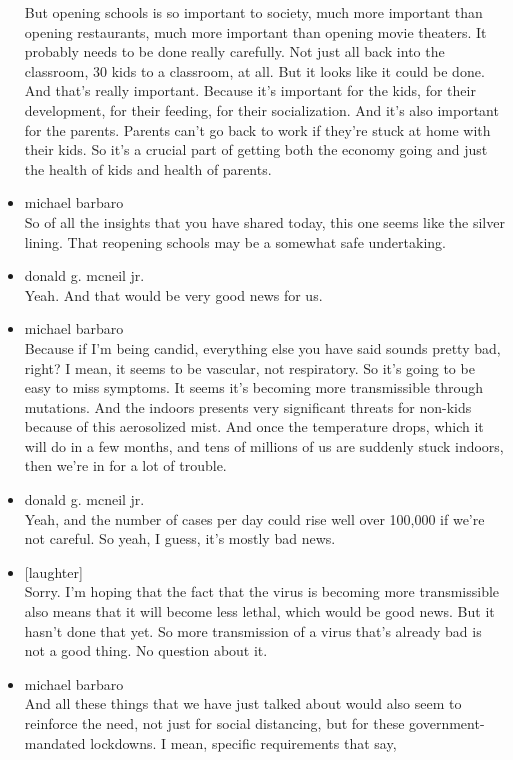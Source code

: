 \begin{itemize}
  But opening schools is so important to society, much more important
  than opening restaurants, much more important than opening movie
  theaters. It probably needs to be done really carefully. Not just all
  back into the classroom, 30 kids to a classroom, at all. But it looks
  like it could be done. And that's really important. Because it's
  important for the kids, for their development, for their feeding, for
  their socialization. And it's also important for the parents. Parents
  can't go back to work if they're stuck at home with their kids. So
  it's a crucial part of getting both the economy going and just the
  health of kids and health of parents.
\item
  michael barbaro\\
  So of all the insights that you have shared today, this one seems like
  the silver lining. That reopening schools may be a somewhat safe
  undertaking.
\item
  donald g. mcneil jr.\\
  Yeah. And that would be very good news for us.
\item
  michael barbaro\\
  Because if I'm being candid, everything else you have said sounds
  pretty bad, right? I mean, it seems to be vascular, not respiratory.
  So it's going to be easy to miss symptoms. It seems it's becoming more
  transmissible through mutations. And the indoors presents very
  significant threats for non-kids because of this aerosolized mist. And
  once the temperature drops, which it will do in a few months, and tens
  of millions of us are suddenly stuck indoors, then we're in for a lot
  of trouble.
\item
  donald g. mcneil jr.\\
  Yeah, and the number of cases per day could rise well over 100,000 if
  we're not careful. So yeah, I guess, it's mostly bad news.
\item
  {[}laughter{]}\\
  Sorry. I'm hoping that the fact that the virus is becoming more
  transmissible also means that it will become less lethal, which would
  be good news. But it hasn't done that yet. So more transmission of a
  virus that's already bad is not a good thing. No question about it.
\item
  michael barbaro\\
  And all these things that we have just talked about would also seem to
  reinforce the need, not just for social distancing, but for these
  government-mandated lockdowns. I mean, specific requirements that say,

\end{itemize}
